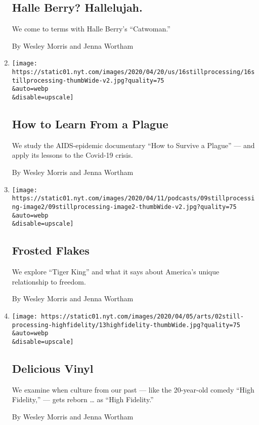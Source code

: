\begin{enumerate}
  \hypertarget{halle-berry-hallelujah}{%
  \subsection{Halle Berry? Hallelujah.}\label{halle-berry-hallelujah}}

  We come to terms with Halle Berry's ``Catwoman.''

  By Wesley Morris and Jenna Wortham
\item
  \href{/2020/04/16/podcasts/still-processing-AIDS-survive-coronavirus.html}{}

  \texttt{[image: https://static01.nyt.com/images/2020/04/20/us/16stillprocessing/16stillprocessing-thumbWide-v2.jpg?quality=75\\\&auto=webp\\\&disable=upscale]}

  \hypertarget{how-to-learn-from-a-plague}{%
  \subsection{How to Learn From a
  Plague}\label{how-to-learn-from-a-plague}}

  We study the AIDS-epidemic documentary ``How to Survive a Plague'' ---
  and apply its lessons to the Covid-19 crisis.

  By Wesley Morris and Jenna Wortham
\item
  \href{/2020/04/09/podcasts/still-processing-tiger-king.html}{}

  \texttt{[image: https://static01.nyt.com/images/2020/04/11/podcasts/09stillprocessing-image2/09stillprocessing-image2-thumbWide-v2.jpg?quality=75\\\&auto=webp\\\&disable=upscale]}

  \hypertarget{frosted-flakes}{%
  \subsection{Frosted Flakes}\label{frosted-flakes}}

  We explore ``Tiger King'' and what it says about America's unique
  relationship to freedom.

  By Wesley Morris and Jenna Wortham
\item
  \href{/2020/04/02/podcasts/high-fidelity-zoe-kravitz.html}{}

  \texttt{[image: https://static01.nyt.com/images/2020/04/05/arts/02still-processing-highfidelity/13highfidelity-thumbWide.jpg?quality=75\\\&auto=webp\\\&disable=upscale]}

  \hypertarget{delicious-vinyl}{%
  \subsection{Delicious Vinyl}\label{delicious-vinyl}}

  We examine when culture from our past --- like the 20-year-old comedy
  ``High Fidelity,'' --- gets reborn \ldots{} as ``High Fidelity.''

  By Wesley Morris and Jenna Wortham
\end{enumerate}

